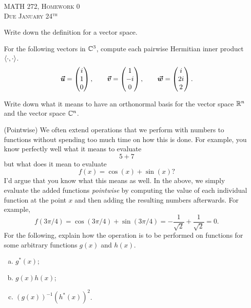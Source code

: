 \documentclass[12pt]{article} %
\begin{document}
\begin{center}
   \textsc{\large MATH 272, Homework 0}\\
   \textsc{Due January 24$^\textrm{th}$}
\end{center}

\begin{problem}
	Write down the definition for a vector space.  
\end{problem}

\begin{problem}
	For the following vectors in $\mathbb{C}^3$, compute each pairwise Hermitian inner product $\left\langle \cdot, \cdot \right\rangle$.  
	\[
		\boldsymbol{\vec{u}} = \begin{pmatrix} i \\ 1 \\ 0 \end{pmatrix}, \qquad \boldsymbol{\vec{v}} = \begin{pmatrix} 1 \\ -i \\ 0 \end{pmatrix}, \qquad \boldsymbol{\vec{w}} = \begin{pmatrix} i \\ 2i \\ 2 \end{pmatrix}.
	\]
\end{problem}

\begin{problem}
	Write down what it means to have an orthonormal basis for the vector space $\mathbb{R}^n$ and the vector space $\mathbb{C}^n$.
\end{problem}

\begin{problem}
	(Pointwise) We often extend operations that we perform with numbers to functions without spending too much time on how this is done. For example, you know perfectly well what it means to evaluate
	\[
		5+7
	\]
	but what does it mean to evaluate
	\[
		f(x)=\cos(x)+\sin(x)?
	\]
	I'd argue that you know what this means as well.  In the above, we simply evaluate the added functions \emph{pointwise} by computing the value of each individual function at the point $x$ and then adding the resulting numbers afterwards. For example,
	\[
		f(3\pi/4)=\cos(3\pi/4) + \sin(3\pi/4)= -\frac{1}{\sqrt{2}}+\frac{1}{\sqrt{2}}=0.
	\]
	For the following, explain how the operation is to be performed on functions for some arbitrary functions $g(x)$ and $h(x)$.
	\begin{enumerate}[(a)]
		\item $g^*(x)$;
		\item $g(x)h(x)$;
		\item $(g(x))^{-1}(h^*(x))^2$.
	\end{enumerate}
\end{problem}
\end{document}
